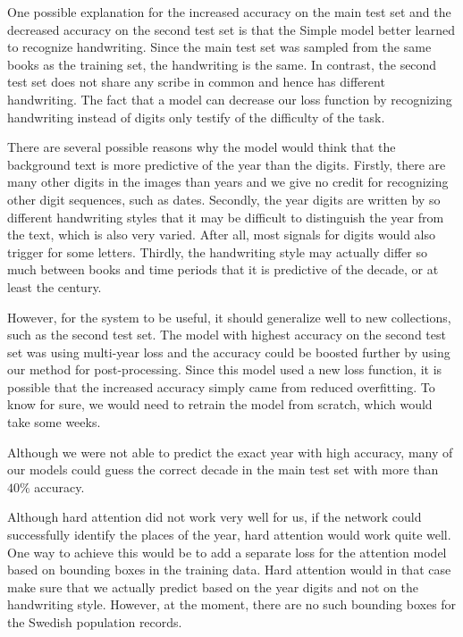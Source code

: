 One possible explanation for the increased accuracy on the main test set and the decreased accuracy on the second test set is that the Simple model better learned to recognize handwriting. Since the main test set was sampled from the same books as the training set, the handwriting is the same. In contrast, the second test set does not share any scribe in common and hence has different handwriting. The fact that a model can decrease our loss function by recognizing handwriting instead of digits only testify of the difficulty of the task.

There are several possible reasons why the model would think that the background text is more predictive of the year than the digits. Firstly, there are many other digits in the images than years and we give no credit for recognizing other digit sequences, such as dates. Secondly, the year digits are written by so different handwriting styles that it may be difficult to distinguish the year from the text, which is also very varied. After all, most signals for digits would also trigger for some letters.
Thirdly, the handwriting style may actually differ so much between books and time periods that it is predictive of the decade, or at least the century.

However, for the system to be useful, it should generalize well to new collections, such as the second test set. The model with highest accuracy on the second test set was using multi-year loss and the accuracy could be boosted further by using our method for post-processing.
Since this model used a new loss function, it is possible that the increased accuracy simply came from reduced overfitting. To know for sure, we would need to retrain the model from scratch, which would take some weeks.

Although we were not able to predict the exact year with high accuracy,
many of our models could guess the correct decade in the main test set with more than $40\%$ accuracy.

Although hard attention did not work very well for us, if the network could successfully identify the places of the year, hard attention would work quite well. One way to achieve this would be to add a separate loss for the attention model based on bounding boxes in the training data. Hard attention would in that case make sure that we actually predict based on the year digits and not on the handwriting style. However, at the moment, there are no such bounding boxes for the Swedish population records.
